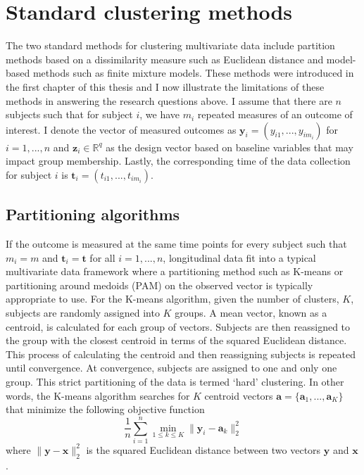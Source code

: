 \documentclass[12pt]{article}
\newcommand{\B}[0]{\mathbf}
\begin{document}
\section{Standard clustering methods}
The two standard methods for clustering multivariate data include partition methods based on a dissimilarity measure such as Euclidean distance and model-based methods such as finite mixture models. These methods were introduced in the first chapter of this thesis and I now illustrate the limitations of these methods in answering the research questions above. I assume that there are $n$ subjects such that for subject $i$, we have $m_{i}$ repeated measures of an outcome of interest. I denote the vector of measured outcomes as $\B y_{i}=(y_{i1},...,y_{im_{i}})$ for $i=1,...,n$ and $\B z_{i}\in \mathbb{R}^{q}$ as the design vector based on baseline variables that may impact group membership. Lastly, the corresponding time of the data collection for subject $i$ is $\B t_{i}=(t_{i1},...,t_{im_{i}})$. 
\subsection{Partitioning algorithms}
If the outcome is measured at the same time points for every subject such that $m_{i}=m$ and $\B t_{i}=\B t$ for all $i=1,...,n$, longitudinal data fit into a typical multivariate data framework where a partitioning method such as K-means \cite{macqueen1967, hartigan1979} or partitioning around medoids (PAM) \cite{kaufman1990} on the observed vector is typically appropriate to use. For the K-means algorithm, given the number of clusters, $K$, subjects are randomly assigned into $K$ groups. A mean vector, known as a centroid, is calculated for each group of vectors. Subjects are then reassigned to the group with the closest centroid in terms of the squared Euclidean distance. This process of calculating the centroid and then reassigning subjects is repeated until convergence. At convergence, subjects are assigned to one and only one group. This strict partitioning of the data is termed `hard' clustering. In other words, the K-means algorithm searches for $K$ centroid vectors $\B a=\{\B a_{1}, ...,\B a_{K}\}$ that minimize the following objective function
$$\frac{1}{n} \sum^{n}_{i=1}\min_{1\leq k\leq K}\|\B  y_{i}-\B a_{k}\|_{2}^{2}$$
where $\|\B y - \B x\|^{2}_{2}$ is the squared Euclidean distance between two vectors $\B y$ and $\B x$.\\
\end{document}
